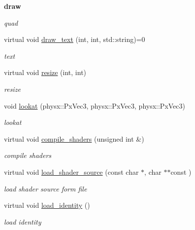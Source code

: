 \begin{Indent}{\bf draw}
\begin{DoxyCompactItemize}
\begin{DoxyCompactList}\small\item\em quad \item\end{DoxyCompactList}\item 
virtual void \hyperlink{classnebula_1_1platform_1_1renderer_1_1gl_1_1base_af810a42a4c3731488253ee268352f456}{draw\_\-text} (int, int, std::string)=0
\begin{DoxyCompactList}\small\item\em text \item\end{DoxyCompactList}\item 
virtual void \hyperlink{classnebula_1_1platform_1_1renderer_1_1gl_1_1base_a03a1e79ed69dc5d9e2a0835986dbe29c}{resize} (int, int)
\begin{DoxyCompactList}\small\item\em resize \item\end{DoxyCompactList}\item 
void \hyperlink{classnebula_1_1platform_1_1renderer_1_1gl_1_1base_a472893303eb888f3742b5f79ee3d4f10}{lookat} (physx::PxVec3, physx::PxVec3, physx::PxVec3)
\begin{DoxyCompactList}\small\item\em lookat \item\end{DoxyCompactList}\item 
virtual void \hyperlink{classnebula_1_1platform_1_1renderer_1_1gl_1_1base_a3f466fa1f31fee02a23a0cf094493430}{compile\_\-shaders} (unsigned int \&)
\begin{DoxyCompactList}\small\item\em compile shaders \item\end{DoxyCompactList}\item 
virtual void \hyperlink{classnebula_1_1platform_1_1renderer_1_1gl_1_1base_aad2760b695c0972220d27f184f723ed2}{load\_\-shader\_\-source} (const char $\ast$, char $\ast$$\ast$const )
\begin{DoxyCompactList}\small\item\em load shader source form file \item\end{DoxyCompactList}\item 
virtual void \hyperlink{classnebula_1_1platform_1_1renderer_1_1gl_1_1base_a94365e0a4b2c11d16fb8c59d5fbbe1a0}{load\_\-identity} ()
\begin{DoxyCompactList}\small\item\em load identity \item\end{DoxyCompactList}\end{DoxyCompactItemize}
\end{Indent}


